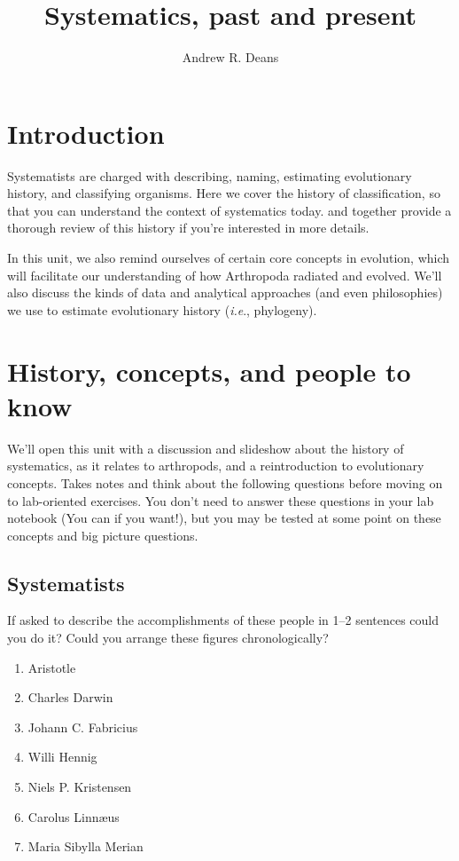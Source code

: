 \documentclass[letterpaper, 11pt]{article}
\title{Systematics, past and present}
\author{Andrew R. Deans}
\begin{document}
\cleanlookdateon %
\maketitle
\thispagestyle{fancy}
\section*{Introduction}
Systematists are charged with describing, naming, estimating evolutionary history, and classifying organisms. Here we cover the history of classification, so that you can understand the context of systematics today. \cite{grimaldi2005evolution} and \cite{EngelKristensen2013} together provide a thorough review of this history if you're interested in more details.

In this unit, we also remind ourselves of certain core concepts in evolution, which will facilitate our understanding of how Arthropoda radiated and evolved. We'll also discuss the kinds of data and analytical approaches (and even philosophies) we use to estimate evolutionary history (\textit{i.e}., phylogeny).

\section{History, concepts, and people to know}
We'll open this unit with a discussion and slideshow about the history of systematics, as it relates to arthropods, and a reintroduction to evolutionary concepts. Takes notes and think about the following questions before moving on to lab-oriented exercises. You don't need to answer these questions in your lab notebook (You can if you want!), but you may be tested at some point on these concepts and big picture questions.
\subsection{Systematists}
If asked to describe the accomplishments of these people in 1--2 sentences could you do it? Could you arrange these figures chronologically?

\begin{enumerate} 
\item{Aristotle} 
\item{Charles Darwin}  
\item {Johann C. Fabricius}
\item {Willi Hennig}
\item Niels P. Kristensen
\item{Carolus Linn\ae{us}}  
\item{Maria Sibylla Merian}  
\end{enumerate}
\end{document}
